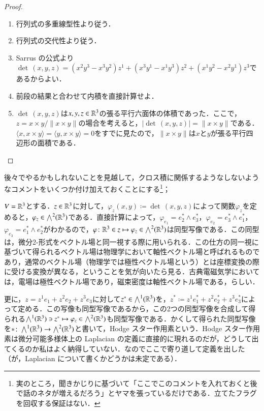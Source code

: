 \begin{proof}
\leavevmode
\begin{enumerate}
\item 行列式の多重線型性より従う．
\item 行列式の交代性より従う．
\item Sarrus の公式より$\det \, (x,y,z) = (x^2y^3 - x^3y^2)z^1 + (x^3y^1 - x^1y^3)z^2 + (x^1y^2 - x^2y^1)z^3$であるからよい．
\item 前段の結果と合わせて内積を直接計算せよ．
\item $\det \, (x,y,z)$は$x,y,z \in \mathbb{R}^3$の張る平行六面体の体積であった．ここで，$z = x \times y / \| x \times y \|$の場合を考えると，$\lvert \det \, (x,y,z) \rvert = \|x \times y\|$である．$\langle x, x \times y \rangle = \langle y, x \times y \rangle = 0$をすでに見たので，$\|x \times y\|$は$x$と$y$が張る平行四辺形の面積である．
\end{enumerate}
\end{proof}

後々でやるかもしれないことを見越して，クロス積に関係するようなしないようなコメントをいくつか付け加えておくことにする\footnote{実のところ，聞きかじりに基づいて「ここでこのコメントを入れておくと後で話のネタが増えるだろう」とヤマを張っているだけである．立てたフラグを回収する保証はない．}；

\begin{exm}
$V = \mathbb{R}^3$とする．$z \in \mathbb{R}^3$に対して，$\varphi_z(x,y) \coloneqq \det\, (x,y,z)$によって関数$\varphi_z$を定めると，$\varphi_z \in \bigwedge^2(\mathbb{R}^3)$である．直接計算によって，$\varphi_{e_1} = e_2^* \wedge e_3^*$，$\varphi_{e_2} = e_3^* \wedge e_1^*$，$\varphi_{e_3} = e_1^* \wedge e_2^*$がわかるので，$\varphi \colon \mathbb{R}^3 \in z \mapsto \varphi_z \in \bigwedge^2(\mathbb{R}^3)$は同型写像である．この同型は，微分2-形式をベクトル場と同一視する際に用いられる．この仕方の同一視に基づいて得られるベクトル場は物理学において軸性ベクトル場と呼ばれるものであり，通常のベクトル場（物理学では極性ベクトル場という）とは座標変換の際に受ける変換が異なる，ということを気が向いたら見る．古典電磁気学においては，電場は極性ベクトル場であり，磁束密度は軸性ベクトル場である，らしい．
\end{exm}

\begin{exm}
更に，$z = z^1 e_1 + z^2 e_2 + z^3 e_3$に対して$z^* \in \bigwedge^1(\mathbb{R}^3)$を，$z^* \coloneqq z^1 e_1^* + z^2 e_2^* + z^3 e_3^*$によって定める．この写像も同型写像であるから，この2つの同型写像を合成して得られる$\bigwedge^1(\mathbb{R}^3) \ni z^* \mapsto \varphi_z \in \bigwedge^2(\mathbb{R}^3)$も同型写像である．かくして得られた同型写像を$* \colon \bigwedge^1(\mathbb{R}^3) \to \bigwedge^2(\mathbb{R}^3)$と書いて，Hodge スター作用素という．Hodge スター作用素は微分可能多様体上の Laplacian の定義に直接的に現れるのだが，どうして出てくるのか私はよく納得していない．なのでここで寄り道して定義を出した（が，Laplacian について書くかどうかは未定である）．
\end{exm}

